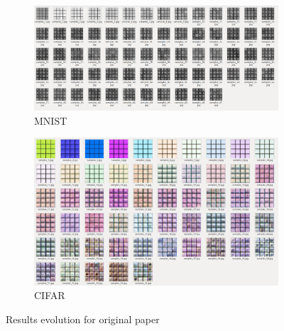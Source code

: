 \documentclass{article}
\begin{document}
    \begin{center}
        \begin{figure}[H]{\textwidth}
            \begin{subfigure}[b]{\textwidth}
                \centering
                \includegraphics[width=0.7\linewidth]{figures/MNIST-original-evolution.png}
                \caption{MNIST}
            \end{subfigure}
            \begin{subfigure}[b]{\textwidth}
                \centering
                \includegraphics[width=0.7\linewidth]{figures/CIFAR-original-evolution.png}
                \caption{CIFAR}
            \end{subfigure}
            \caption{Results evolution for original paper}
        \end{figure}
    \end{center}
\end{document}
